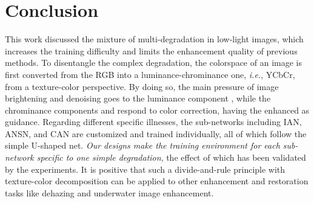 \documentclass[10pt,twocolumn,letterpaper]{article}
\begin{document}
\section{Conclusion}
This work discussed the mixture of multi-degradation in low-light images, which increases the training difficulty and limits the enhancement quality of previous methods. To disentangle the complex degradation, the colorspace of an image is first converted from the RGB into a luminance-chrominance one, \textit{i.e.}, YCbCr, from a texture-color perspective. By doing so, the main pressure of image brightening and denoising goes to the luminance component , while the chrominance components  and  respond to color correction, having the enhanced  as guidance. Regarding different specific illnesses, the sub-networks including IAN, ANSN, and CAN are customized and trained individually, all of which follow the simple U-shaped net. \emph{Our designs make the training environment for each sub-network specific to one simple degradation}, the effect of which has been validated by the experiments. It is positive that such a divide-and-rule principle with texture-color decomposition can be applied to other enhancement and restoration tasks like dehazing and underwater image enhancement. 

{\small


}
\end{document}
